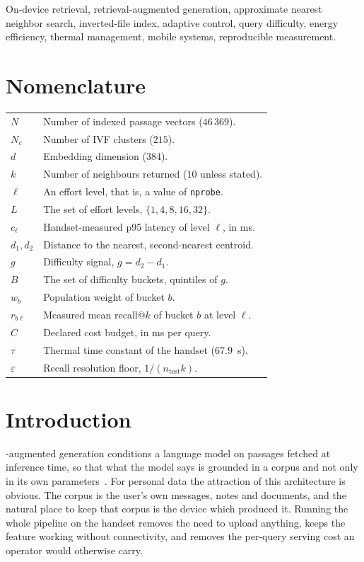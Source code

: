 \documentclass[journal]{IEEEtran}
\newcommand{\nprobe}{\texttt{nprobe}}
\begin{document}
\begin{IEEEkeywords}
On-device retrieval, retrieval-augmented generation, approximate nearest
neighbor search, inverted-file index, adaptive control, query difficulty,
energy efficiency, thermal management, mobile systems, reproducible
measurement.
\end{IEEEkeywords}

\section*{Nomenclature}
\noindent
\begin{tabular}{@{}ll@{}}
$N$ & Number of indexed passage vectors ($46\,369$).\\
$N_c$ & Number of IVF clusters ($215$).\\
$d$ & Embedding dimension ($384$).\\
$k$ & Number of neighbours returned ($10$ unless stated).\\
$\ell$ & An effort level, that is, a value of \nprobe.\\
$L$ & The set of effort levels, $\{1,4,8,16,32\}$.\\
$c_\ell$ & Handset-measured p95 latency of level $\ell$, in ms.\\
$d_1,d_2$ & Distance to the nearest, second-nearest centroid.\\
$g$ & Difficulty signal, $g = d_2 - d_1$.\\
$B$ & The set of difficulty buckets, quintiles of $g$.\\
$w_b$ & Population weight of bucket $b$.\\
$r_{b\ell}$ & Measured mean recall@$k$ of bucket $b$ at level $\ell$.\\
$C$ & Declared cost budget, in ms per query.\\
$\tau$ & Thermal time constant of the handset ($67.9$~s).\\
$\varepsilon$ & Recall resolution floor, $1/(n_{\mathrm{test}}k)$.\\
\end{tabular}

\section{Introduction}

-augmented generation conditions a language model
on passages fetched at inference time, so that what the model says is
grounded in a corpus and not only in its own
parameters~\cite{lewis2020rag,karpukhin2020dpr,gao2023ragsurvey}. For
personal data the attraction of this architecture is obvious. The corpus
is the user's own messages, notes and documents, and the natural place to
keep that corpus is the device which produced it. Running the whole
pipeline on the handset removes the need to upload anything, keeps the
feature working without connectivity, and removes the per-query serving
cost an operator would otherwise carry.
\end{document}
